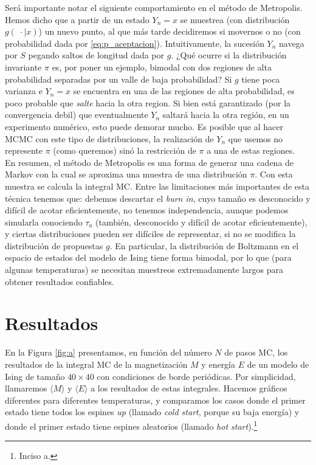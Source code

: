 \documentclass[a4paper,12pt]{article}
\begin{document}
Será importante notar el siguiente comportamiento en el método de Metropolis. Hemos dicho que a partir de un estado $Y_n = x$ se muestrea (con distribución $g(\; \cdot \mid x)$) un nuevo punto, al que más tarde decidiremos si movernos o no (con probabilidad dada por \eqref{eq:p_aceptacion}). Intuitivamente, la sucesión $Y_n$ navega por $S$ pegando saltos de longitud dada por $g$. ¿Qué ocurre si la distribución invariante $\pi$ es, por poner un ejemplo, bimodal con dos regiones de alta probabilidad separadas por un valle de baja probabilidad? Si $g$ tiene poca varianza e $Y_n = x$ se encuentra en una de las regiones de alta probabilidad, es poco probable que {\it salte} hacia la otra region. Si bien está garantizado (por la convergencia debil) que eventualmente $Y_n$ saltará hacia la otra región, en un experimento numérico, esto puede demorar mucho. Es posible que al hacer MCMC con este tipo de distribuciones, la realización de $Y_n$ que usemos no represente $\pi$ (como queremos) sinó la restricción de $\pi$ a una de estas regiones.\\

En resumen, el método de Metropolis es una forma de generar una cadena de Markov con la cual se aproxima una muestra de una distribución $\pi$. Con esta muestra se calcula la integral MC. Entre las limitaciones más importantes de esta técnica tenemos que: debemos descartar el {\it burn in}, cuyo tamaño es desconocido y difícil de acotar eficientemente, no tenemos independencia, aunque podemos simularla conociendo $\tau_a$ (también, desconocido y difícil de acotar eficientemente), y ciertas distribuciones pueden ser difíciles de representar, si no se modifica la distribución de propuestas $g$. En particular, la distribución de Boltzmann en el espacio de estados del modelo de Ising tiene forma bimodal, por lo que (para algunas temperaturas) se necesitan muestreos extremadamente largos para obtener resultados confiables.

\section{Resultados}

En la Figura \ref{fig:a} presentamos, en función del número $N$ de pasos MC, los resultados de la integral MC de la magnetización $M$ y energía $E$ de un modelo de Ising de tamaño $40 \times 40$ con condiciones de borde periódicas. Por simplicidad, llamaremos $\langle M \rangle$ y $\langle E \rangle$ a los resultados de estas integrales. Hacemos gráficos diferentes para diferentes temperaturas, y comparamos los casos donde el primer estado tiene todos los espines {\it up} (llamado {\it cold start}, porque su baja energía) y donde el primer estado tiene espines aleatorios (llamado {\it hot start}).\footnote{Inciso a.}
\end{document}
